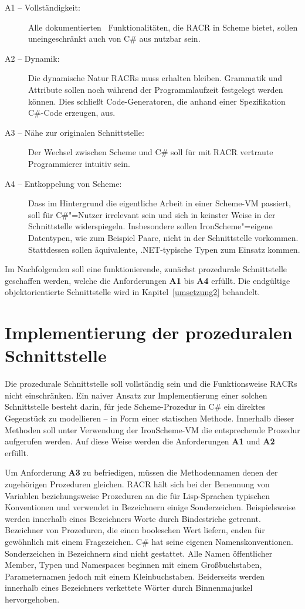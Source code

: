 \begin{description}
	\item[A1 – Vollständigkeit:] Alle dokumentierten~\cite{Buerger2012} Funktionalitäten, die RACR in Scheme bietet, sollen uneingeschränkt auch von C\# aus nutzbar sein.
	\item[A2 – Dynamik:] Die dynamische Natur RACRs muss erhalten bleiben. Grammatik und Attribute sollen noch während der Programmlaufzeit festgelegt werden können. Dies schließt Code-Generatoren, die anhand einer Spezifikation C\#-Code erzeugen, aus.
	\item[A3 – Nähe zur originalen Schnittstelle:] Der Wechsel zwischen Scheme und C\# soll für mit RACR vertraute Programmierer intuitiv sein.
	\item[A4 – Entkoppelung von Scheme:] Dass im Hintergrund die eigentliche Arbeit in einer Scheme-VM passiert, soll für C\#"=Nutzer irrelevant sein und sich in keinster Weise in der Schnittstelle widerspiegeln. Insbesondere sollen IronScheme"=eigene Datentypen, wie zum Beispiel Paare, nicht in der Schnittstelle vorkommen. Stattdessen sollen äquivalente, .NET-typische Typen zum Einsatz kommen.
\end{description}

Im Nachfolgenden soll eine funktionierende, zunächst prozedurale Schnittstelle geschaffen werden, welche die Anforderungen \textbf{A1} bis \textbf{A4} erfüllt. Die endgültige objektorientierte Schnittstelle wird in Kapitel~\ref{umsetzung2} behandelt.

\section{Implementierung der prozeduralen Schnittstelle}

Die prozedurale Schnittstelle soll vollständig sein und die Funktionsweise RACRs nicht einschränken. Ein naiver Ansatz zur Implementierung einer solchen Schnittstelle besteht darin, für jede Scheme-Prozedur in C\# ein direktes Gegenstück zu modellieren – in Form einer statischen Methode. Innerhalb dieser Methoden soll unter Verwendung der IronScheme-VM die entsprechende Prozedur aufgerufen werden. Auf diese Weise werden die Anforderungen \textbf{A1} und \textbf{A2} erfüllt.

Um Anforderung \textbf{A3} zu befriedigen, müssen die Methodennamen denen der zugehörigen Prozeduren gleichen. RACR hält sich bei der Benennung von Variablen beziehungsweise Prozeduren an die für Lisp-Sprachen typischen Konventionen und verwendet in Bezeichnern einige Sonderzeichen. Beispielsweise werden innerhalb eines Bezeichners Worte durch Bindestriche getrennt. Bezeichner von Prozeduren, die einen booleschen Wert liefern, enden für gewöhnlich mit einem Fragezeichen. C\# hat seine eigenen Namenskonventionen. Sonderzeichen in Bezeichnern sind nicht gestattet. Alle Namen öffentlicher Member, Typen und Namespaces beginnen mit einem Großbuchstaben, Parameternamen jedoch mit einem Kleinbuchstaben. Beiderseits werden innerhalb eines Bezeichners verkettete Wörter durch Binnenmajuskel hervorgehoben.

